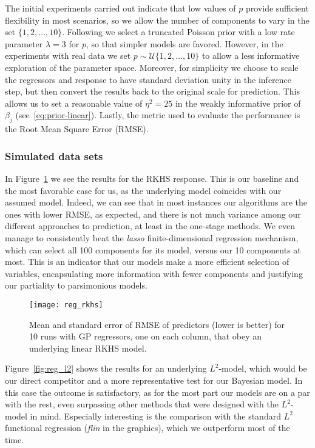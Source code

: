 \documentclass{article}
\numberwithin{equation}{section}
\theoremstyle{plain}
\theoremstyle{definition}
\begin{document}
The initial experiments carried out indicate that low values of \(p\) provide sufficient flexibility in most scenarios, so we allow the number of components to vary in the set \(\{1,2,\dots,10\}\). Following \citet{nobile2007bayesian} we select a truncated Poisson prior with a low rate parameter \(\lambda=3\) for \(p\), so that simpler models are favored. However, in the experiments with real data we set \(p\sim \mathcal U\{1,2,\dots,10\}\) to allow a less informative exploration of the parameter space. Moreover, for simplicity we choose to scale the regressors and response to have standard deviation unity in the inference step, but then convert the results back to the original scale for prediction. This allows us to set a reasonable value of \(\eta^2=25\) in the weakly informative prior of \(\beta_j\) (see~\eqref{eq:prior-linear}). Lastly, the metric used to evaluate the performance is the Root Mean Square Error (RMSE).

\subsubsection*{Simulated data sets}

In Figure~\ref{fig:reg_rkhs} we see the results for the RKHS response. This is our baseline and the most favorable case for us, as the underlying model coincides with our assumed model. Indeed, we can see that in most instances our algorithms are the ones with lower RMSE, as expected, and there is not much variance among our different approaches to prediction, at least in the one-stage methods. We even manage to consistently beat the \textit{lasso} finite-dimensional regression mechanism, which can select all 100 components for its model, versus our 10 components at most. This is an indicator that our models make a more efficient selection of variables, encapsulating more information with fewer components and justifying our partiality to parsimonious models.

\begin{figure}[ht!]
  \centering
  \texttt{[image: reg\_rkhs]}
  \caption{Mean and standard error of RMSE of predictors (lower is better) for 10 runs with GP regressors, one on each column, that obey an underlying linear RKHS model.}\label{fig:reg_rkhs}
\end{figure}

Figure~\ref{fig:reg_l2} shows the results for an underlying \(L^2\)-model, which would be our direct competitor and a more representative test for our Bayesian model. In this case the outcome is satisfactory, as for the most part our models are on a par with the rest, even surpassing other methods that were designed with the \(L^2\)-model in mind. Especially interesting is the comparison with the standard \(L^2\) functional regression (\textit{flin} in the graphics), which we outperform most of the time.
\end{document}
